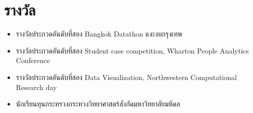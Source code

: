 \section{\sc รางวัล}

\begin{itemize}[leftmargin=0cm, label={}]
\itemsep0em

\item รางวัลประกวดอันดับที่สอง Bangkok Datathon แงะงบกรุงเทพ

\item รางวัลประกวดอันดับที่สอง Student case competition, Wharton People Analytics Conference

\item รางวัลประกวดอันดับที่สอง Data Visualization, Northwestern Computational Research day

\item นักเรียนทุนกระทรวงกระทวงวิทยาศาสตร์สังกัดมหาวิทยาลัยมหิดล

\end{itemize}
